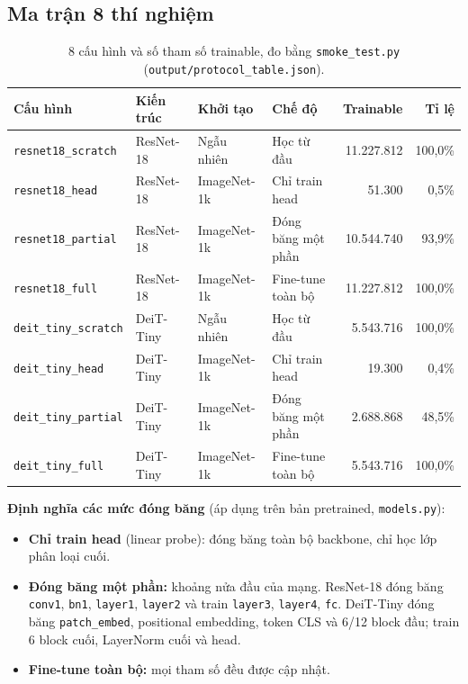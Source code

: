 \documentclass[12pt]{article}
\newcommand{\code}[1]{\texttt{#1}}
\newcommand{\st}[1]{\textbf{#1}}
\begin{document}
\subsection{Ma trận 8 thí nghiệm}
\begin{table}[H]
\centering
\caption{8 cấu hình và số tham số trainable, đo bằng \code{smoke\_test.py} (\code{output/protocol\_table.json}).}\label{tab:matrix}
\begin{tabularx}{\linewidth}{@{}lllLrr@{}}
\toprule
Cấu hình & Kiến trúc & Khởi tạo & Chế độ & Trainable & Tỉ lệ \\\midrule
\code{resnet18\_scratch}  & ResNet-18 & Ngẫu nhiên  & Học từ đầu         & 11.227.812 & 100,0\% \\
\code{resnet18\_head}     & ResNet-18 & ImageNet-1k & Chỉ train head     &     51.300 &   0,5\% \\
\code{resnet18\_partial}  & ResNet-18 & ImageNet-1k & Đóng băng một phần & 10.544.740 &  93,9\% \\
\code{resnet18\_full}     & ResNet-18 & ImageNet-1k & Fine-tune toàn bộ  & 11.227.812 & 100,0\% \\\midrule
\code{deit\_tiny\_scratch} & DeiT-Tiny & Ngẫu nhiên  & Học từ đầu         &  5.543.716 & 100,0\% \\
\code{deit\_tiny\_head}    & DeiT-Tiny & ImageNet-1k & Chỉ train head     &     19.300 &   0,4\% \\
\code{deit\_tiny\_partial} & DeiT-Tiny & ImageNet-1k & Đóng băng một phần &  2.688.868 &  48,5\% \\
\code{deit\_tiny\_full}    & DeiT-Tiny & ImageNet-1k & Fine-tune toàn bộ  &  5.543.716 & 100,0\% \\
\bottomrule
\end{tabularx}
\end{table}

\textbf{Định nghĩa các mức đóng băng} (áp dụng trên bản pretrained, \code{models.py}):
\begin{itemize}
  \item \st{Chỉ train head} (linear probe): đóng băng toàn bộ backbone, chỉ học lớp phân loại cuối.
  \item \st{Đóng băng một phần:} khoảng nửa đầu của mạng. ResNet-18 đóng băng \code{conv1}, \code{bn1}, \code{layer1},
        \code{layer2} và train \code{layer3}, \code{layer4}, \code{fc}. DeiT-Tiny đóng băng \code{patch\_embed},
        positional embedding, token CLS và 6/12 block đầu; train 6 block cuối, LayerNorm cuối và head.
  \item \st{Fine-tune toàn bộ:} mọi tham số đều được cập nhật.
\end{itemize}
\end{document}
